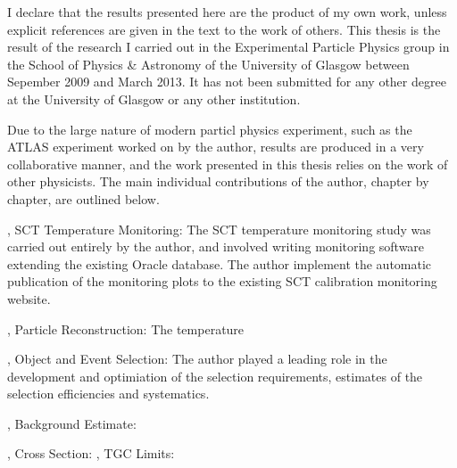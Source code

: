 I declare that the results presented here are the product of my own work, unless
explicit references are given in the text to the work of others. This thesis is
the result of the research I carried out in the Experimental Particle Physics
group in the School of Physics \& Astronomy of the University of Glasgow between
Sepember 2009 and March 2013. It has not been submitted for any other degree
at the University of Glasgow or any other institution.

Due to the large nature of modern particl physics experiment, such as the ATLAS
experiment worked on by the author, results are produced in a very collaborative
manner, and the work presented in this thesis relies on the work of other
physicists. The main individual contributions of the author, chapter by chapter, are outlined below.

, SCT Temperature Monitoring: The SCT temperature monitoring study was
carried out entirely by the author, and involved writing monitoring software
extending the existing Oracle database. The author implement the automatic
publication of the monitoring plots to the existing SCT calibration monitoring
website.

, Particle Reconstruction: The temperature

, Object and Event Selection: The author played a
leading role in the development and optimiation of the selection requirements,
estimates of the selection efficiencies and systematics.

, Background Estimate: 

, Cross Section: 
, TGC Limits: 
